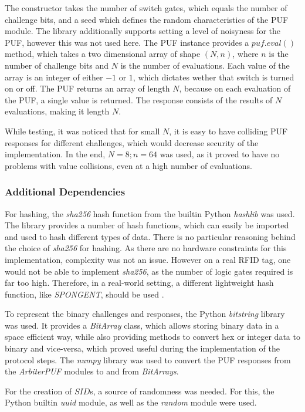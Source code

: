 The constructor takes the number of switch gates, which equals the number of challenge bits, and a seed
which defines the random characteristics of the PUF module.
The library additionally supports setting a level of noisyness for the PUF, however this was not used here.
The PUF instance provides a $puf.eval()$ method, which takes a two dimensional array of shape $(N, n)$,
where $n$ is the number of challenge bits and $N$ is the number of evaluations.
Each value of the array is an integer  of either $-1$ or $1$, which dictates wether that switch is turned on or off.
The PUF returns an array of length $N$, because on each evaluation of the PUF, a single value is returned.
The response consists of the results of $N$ evaluations, making it length $N$.

While testing, it was noticed that for small $N$, it is easy to have colliding PUF responses for different challenges,
which would decrease security of the implementation.
In the end, $N = 8; n = 64$ was used, as it proved to have no problems with value collisions, even at a high
number of evaluations.

\subsubsection{Additional Dependencies}

For hashing, the \emph{sha256} hash function from the builtin Python \emph{hashlib} was used.
The library provides a number of hash functions, which can easily be imported and used to hash different types of data.
There is no particular reasoning behind the choice of \emph{sha256} for hashing. As there are no hardware constraints
for this implementation, complexity was not an issue. However on a real RFID tag, one would not be able
to implement \emph{sha256}, as the number of logic gates required is far too high.
Therefore, in a real-world setting, a different lightweight hash function, like \emph{SPONGENT}, should be used \cite[][p. 2]{Zhu2019}.

To represent the binary challenges and responses, the Python \emph{bitstring} library was used.
It provides a \emph{BitArray} class, which allows storing binary data in a space efficient way, while also
providing methods to convert hex or integer data to binary and vice-versa, which proved useful during the
implementation of the protocol steps.
The \emph{numpy} library was used to convert the PUF responses from the \emph{ArbiterPUF} modules to and from \emph{BitArrays}.

For the creation of $SID$s, a source of randomness was needed. For this, the Python builtin \emph{uuid} module,
as well as the \emph{random} module were used.

